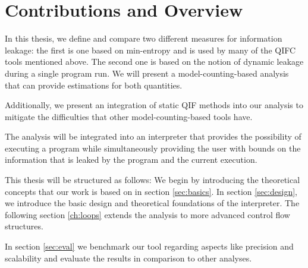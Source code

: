 \section{Contributions and Overview}
In this thesis, we define and compare two different measures for information leakage: the first is one based on min-entropy and is used by many of the QIFC tools mentioned above. The second one is based on the notion of dynamic leakage during a single program run. We will present a model-counting-based analysis that can provide estimations for both quantities.

Additionally, we present an integration of static QIF methods into our analysis to mitigate the difficulties that other model-counting-based tools have.

The analysis will be integrated into an interpreter that provides the possibility of executing a program while simultaneously providing the user with bounds on the information that is leaked by the program and the current execution.

This thesis will be structured as follows: We begin by introducing the theoretical concepts that our work is based on in section \ref{sec:basics}. In section \ref{sec:design}, we introduce the basic design and theoretical foundations of the interpreter. The following section \ref{ch:loops} extends the analysis to more advanced control flow structures.

In section \ref{sec:eval} we benchmark our tool regarding aspects like precision and scalability and evaluate the results in comparison to other analyses.
